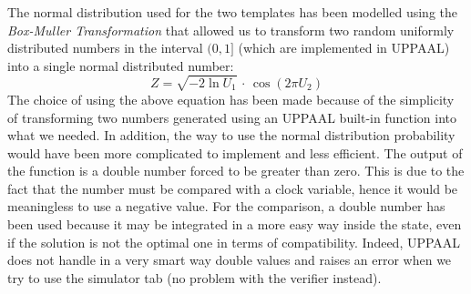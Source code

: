\documentclass{article}
\begin{document}
			The normal distribution used for the two templates has been modelled using the \emph{Box-Muller Transformation} that allowed us to transform two random uniformly distributed numbers in the interval $(0,1]$ (which are implemented in UPPAAL) into a single normal distributed number:
			\begin{equation}
				Z = \sqrt{-2\ln{U_1}}\,\cdot\,\cos{(2\pi U_2)}
			\end{equation}
			The choice of using the above equation has been made because of the simplicity of transforming two numbers generated using an UPPAAL built-in function into what we needed. In addition, the way to use the normal distribution probability would have been more complicated to implement and less efficient. The output of the function is a double number forced to be greater than zero. This is due to the fact that the number must be compared with a clock variable, hence it would be meaningless to use a negative value. For the comparison, a double number has been used because it may be integrated in a more easy way inside the state, even if the solution is not the optimal one in terms of compatibility. Indeed, UPPAAL does not handle in a very smart way double values and raises an error when we try to use the simulator tab (no problem with the verifier instead).
			
\end{document}
